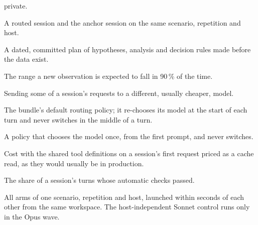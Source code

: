 \begin{description}[leftmargin=1.2em,style=nextline,itemsep=3pt]
    private.
  \item[Pair] A routed session and the anchor session on the same scenario, repetition and host.
  \item[Preregistration] A dated, committed plan of hypotheses, analysis and decision rules made before
    the data exist.
  \item[Prediction interval (90\,\%)] The range a new observation is expected to fall in 90\,\% of the time.
  \item[Routing] Sending some of a session's requests to a different, usually cheaper, model.
  \item[Shipped] The bundle's default routing policy; it re-chooses its model at the start of each turn and never
    switches in the middle of a turn.
  \item[Sticky] A policy that chooses the model once, from the first prompt, and never switches.
  \item[Tools-normalized cost] Cost with the shared tool definitions on a session's first request priced as
    a cache read, as they would usually be in production.
  \item[Turn-pass fraction] The share of a session's turns whose automatic checks passed.
  \item[Wave] All arms of one scenario, repetition and host, launched within seconds of each other from the same
    workspace. The host-independent Sonnet control runs only in the Opus wave.
\end{description}
